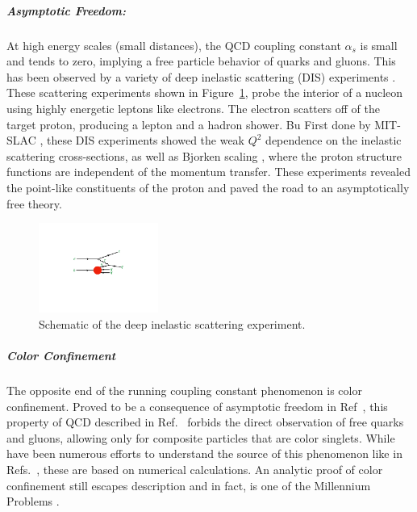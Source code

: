 \subparagraph{Asymptotic Freedom: }
At high energy scales (small distances), the QCD coupling constant $\alpha_s$ is small and tends to zero, implying a free particle behavior of quarks and gluons\cite{PhysRevLett.30.1343, PhysRevD.8.3633}.
This has been observed by a variety of deep inelastic scattering (DIS) experiments \cite{Deur:2014vea, Kim:1998kia, Altarelli:1996nm, RevModPhys.63.597, Kataev:2001kk, Alekhin:2012ig, Alekhin:2013nua, Blumlein:2006be, Aaron:2007xx, Chekanov:2007pa, Chekanov:2008af, Abramowicz:2010cka, Abramowicz:2010ke, Aaron:2009vs}.
These scattering experiments shown in Figure~\ref{fig:dis_schematic}, probe the interior of a nucleon using highly energetic leptons like electrons. The electron scatters off of the target proton, producing a lepton and a hadron shower. Bu 
First done by MIT-SLAC \cite{PhysRevLett.23.930, PhysRevLett.23.935}, these DIS experiments showed the weak $Q^2$ dependence on the inelastic scattering cross-sections, as well as Bjorken scaling \cite{PhysRev.179.1547}, where the proton structure functions are independent of the momentum transfer.
These experiments revealed the point-like constituents of the proton and paved the road to an asymptotically free theory.

\begin{figure}[htbp]
\begin{center}
\includegraphics[width=0.35\textwidth]{figures/theory/DIS}
\caption{Schematic of the deep inelastic scattering experiment.}
\label{fig:dis_schematic}
\end{center}
\end{figure}


\subparagraph{Color Confinement}
The opposite end of the running coupling constant phenomenon is color confinement.
Proved to be a consequence of asymptotic freedom in Ref~\cite{Nishijima1996}, this property of QCD described in Ref.~\cite{PhysRevD.10.2445} forbids the direct observation of free quarks and gluons, allowing only for composite particles that are color singlets.
While have been numerous efforts to understand the source of this phenomenon like in Refs.~\cite{BUCHMULLER1982479, KOGUT1976199, PhysRevD.31.2910, PhysRevD.57.2603, PhysRevD.62.114503, RevModPhys.55.775, PhysRevLett.90.102001}, these are based on numerical calculations.
An analytic proof of color confinement still escapes description and in fact, is one of the Millennium Problems \cite{MillenniumProb}.


